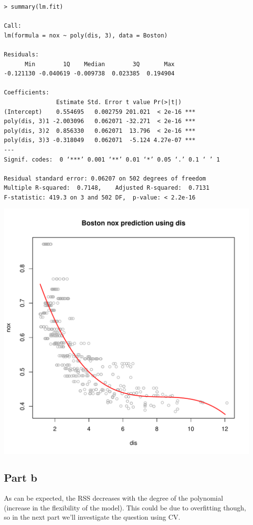 \documentclass[11pt, a4paper]{article}
\begin{document}
\begin{verbatim}
> summary(lm.fit)

Call:
lm(formula = nox ~ poly(dis, 3), data = Boston)

Residuals:
      Min        1Q    Median        3Q       Max 
-0.121130 -0.040619 -0.009738  0.023385  0.194904 

Coefficients:
               Estimate Std. Error t value Pr(>|t|)    
(Intercept)    0.554695   0.002759 201.021  < 2e-16 ***
poly(dis, 3)1 -2.003096   0.062071 -32.271  < 2e-16 ***
poly(dis, 3)2  0.856330   0.062071  13.796  < 2e-16 ***
poly(dis, 3)3 -0.318049   0.062071  -5.124 4.27e-07 ***
---
Signif. codes:  0 ‘***’ 0.001 ‘**’ 0.01 ‘*’ 0.05 ‘.’ 0.1 ‘ ’ 1

Residual standard error: 0.06207 on 502 degrees of freedom
Multiple R-squared:  0.7148,    Adjusted R-squared:  0.7131 
F-statistic: 419.3 on 3 and 502 DF,  p-value: < 2.2e-16
\end{verbatim}

\includegraphics[scale=0.6]{parta.pdf}
\subsection{Part b}
\label{sec-2-2}


As can be expected, the RSS decreases with the degree of the
polynomial (increase in the flexibility of the model). This could be
due to overfitting though, so in the next part we'll investigate the
question using CV.
\end{document}
